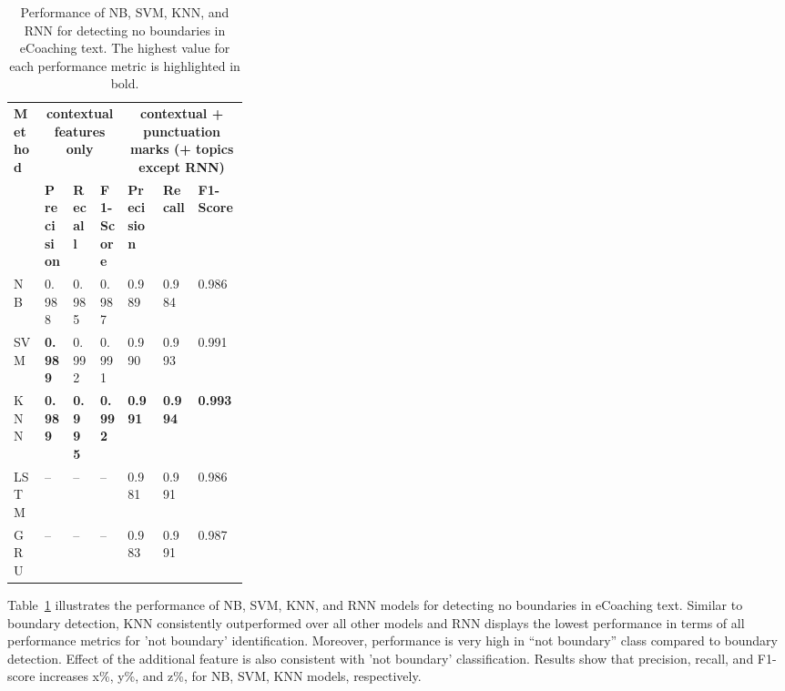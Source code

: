 \documentclass{amia}
\begin{document}
\begin{table}[ht]
\centering
\caption{Performance of NB, SVM, KNN, and RNN  for detecting no boundaries in eCoaching text. The highest value for each performance metric is highlighted in bold.}
\label{tab:result_not_boundary}
  \begin{tabular}{|l|l|l|l|p{0.15\linewidth}|p{0.15\linewidth}|l|}
  \hline
   \multirow{2}{*}{\textbf{Method}} & \multicolumn{3}{|c|}{\textbf{contextual features only}} & \multicolumn{3}{|c|}{\textbf{contextual + punctuation marks (+ topics except RNN)}} \\\cline{2-7}
   & \textbf{Precision}  & \textbf{Recall} & \textbf{F1-Score} & \textbf{Precision}  & \textbf{Recall} & \textbf{F1-Score}\\ \hline    
    
 NB & 0.988 & 0.985 & 0.987 & 0.989 & 0.984 & 0.986 \\ \hline
 SVM & \textbf{0.989} & 0.992 & 0.991 & 0.990 & 0.993 & 0.991\\ \hline
 KNN & \textbf{0.989} & \textbf{0.995} & \textbf{0.992} & \textbf{0.991} & \textbf{0.994} & \textbf{0.993}\\ \hline
 LSTM & -- & -- & -- & 0.981 & 0.991 & 0.986 \\ \hline
 GRU & -- & -- & -- & 0.983 & 0.991 & 0.987 \\ \hline 
  \end{tabular}
\end{table}

Table~\ref{tab:result_not_boundary} illustrates the performance of NB, SVM, KNN, and RNN models for detecting no boundaries in eCoaching text. Similar to boundary detection, KNN consistently outperformed over all other models and RNN displays the lowest performance in terms of all performance metrics for 'not boundary' identification. Moreover, performance is very high in ``not boundary'' class compared to boundary detection. Effect of the additional feature is also consistent with 'not boundary' classification. Results show that precision, recall, and F1-score increases x\%, y\%, and z\%, for NB, SVM, KNN models, respectively. \\
\end{document}
